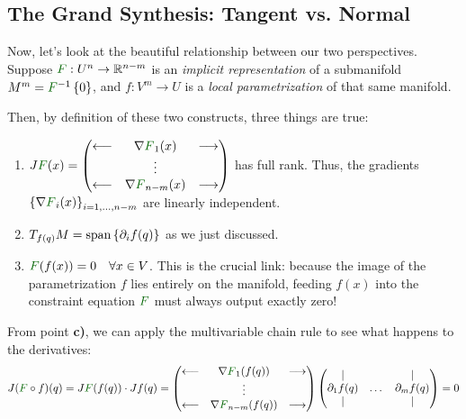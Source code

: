 \subsection*{The Grand Synthesis: Tangent vs. Normal}

Now, let's look at the beautiful relationship between our two perspectives. Suppose $\textcolor{eDarkGreen}{F}: U^n \to \R^{n-m}$ is an \emph{implicit representation} of a submanifold $M^m = \textcolor{eDarkGreen}{F}^{-1}\set{0}$, and $f: V^m \to U$ is a \emph{local parametrization} of that same manifold.

Then, by definition of these two constructs, three things are true:
\begin{enumerate}
    \item $J\textcolor{eDarkGreen}{F}(x) = \begin{pmatrix} \longleftarrow & \nabla \textcolor{eDarkGreen}{F}_1(x) & \longrightarrow \\ & \vdots & \\ \longleftarrow & \nabla \textcolor{eDarkGreen}{F}_{n-m}(x) & \longrightarrow \end{pmatrix}$ has full rank. Thus, the gradients $\set{\nabla \textcolor{eDarkGreen}{F}_i(x)}_{i=1,\dots,n-m}$ are linearly independent.
    \item $T_{f(q)} M = \operatorname{span}\left\{ \partial_i f(q) \right\}$ as we just discussed.
    \item $\textcolor{eDarkGreen}{F}(f(x)) = 0 \quad \forall x \in V$. This is the crucial link: because the image of the parametrization $f$ lies entirely on the manifold, feeding $f(x)$ into the constraint equation $\textcolor{eDarkGreen}{F}$ must always output exactly zero!
\end{enumerate}

From point \textbf{c)}, we can apply the multivariable chain rule to see what happens to the derivatives:
\[ J(\textcolor{eDarkGreen}{F} \circ f)(q) = J\textcolor{eDarkGreen}{F}(f(q)) \cdot Jf(q) = \begin{pmatrix} \longleftarrow & \nabla \textcolor{eDarkGreen}{F}_1(f(q)) & \longrightarrow \\ & \vdots & \\ \longleftarrow & \nabla \textcolor{eDarkGreen}{F}_{n-m}(f(q)) & \longrightarrow \end{pmatrix} \begin{pmatrix} | & & | \\ \partial_1 f(q) & \dots & \partial_m f(q) \\ | & & | \end{pmatrix} = 0 \]

